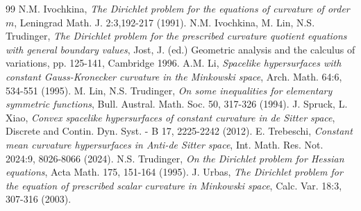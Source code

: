 \documentclass[10pt,reqno,oneside]{amsart}
\theoremstyle{definition}
\theoremstyle{remark}
\begin{document}
\begin{thebibliography}{99}
 N.M. Ivochkina, \textit{The Dirichlet problem for the equations of curvature of order $m$}, Leningrad Math. J. 2:3,192-217 (1991).
N.M. Ivochkina, M. Lin, N.S. Trudinger, \textit{The Dirichlet problem for the prescribed curvature quotient equations with general boundary values}, Jost, J. (ed.) Geometric analysis and the calculus of variations, pp. 125-141, Cambridge 1996.
 A.M. Li, \textit{Spacelike hypersurfaces with constant Gauss-Kronecker curvature in the Minkowski space}, Arch. Math. 64:6, 534-551 (1995).
 M. Lin, N.S. Trudinger, \textit{On some inequalities for elementary symmetric functions}, Bull. Austral. Math. Soc. 50, 317-326 (1994).
 J. Spruck, L. Xiao, \textit{Convex spacelike hypersurfaces of constant curvature in de Sitter space}, Discrete and Contin. Dyn. Syst. - B 17, 2225-2242 (2012).
 E. Trebeschi, \textit{Constant mean curvature hypersurfaces in Anti-de Sitter space}, Int. Math. Res. Not. 2024:9, 8026-8066 (2024).
 N.S. Trudinger, \textit{On the Dirichlet problem for Hessian equations}, Acta Math. 175, 151-164 (1995).
 J. Urbas, \textit{The Dirichlet problem for the equation of prescribed scalar curvature in Minkowski space}, Calc. Var. 18:3, 307-316 (2003). 
\end{thebibliography}
\end{document}

